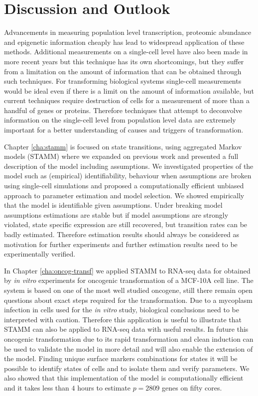 \chapter{Discussion and Outlook}
\label{cha:discussion-outlook}

Advancements in measuring population level transcription, proteomic abundance and epigenetic information cheaply has lead to widespread application of these methods. Additional measurements on a single-cell level have also been made in more recent years \citep{Wheeler:2003ka, Dalerba:2011cc, Wang:2010ew} but this technique has its own shortcomings, but they suffer from a limitation on the amount of information that can be obtained through such techniques. For transforming biological systems single-cell measurements would be ideal even if there is a limit on the amount of information available, but current techniques require destruction of cells for a measurement of more than a handful of genes or proteins. Therefore techniques that attempt to deconvolve information on the single-cell level from population level data are extremely important for a better understanding of causes and triggers of transformation. 

Chapter \ref{cha:stamm} is focused on state transitions, using aggregated Markov models (STAMM) where we expanded on previous work \citep{Armond:2013} and presented a full description of the model including assumptions. We investigated properties of the model such as (empirical) identifiability, behaviour when assumptions are broken using single-cell simulations and proposed a computationally efficient unbiased approach to parameter estimation and model selection. We showed empirically that the model is identifiable given assumptions. Under breaking model assumptions estimations are stable but if model assumptions are strongly violated, state specific expression are still recovered, but transition rates can be badly estimated. Therefore estimation results should always be considered as motivation for further experiments and further estimation results need to be experimentally verified.

In Chapter \ref{cha:oncog-transf} we applied STAMM to RNA-seq data for obtained by {\it in vitro} experiments for oncogenic transformation of a MCF-10A cell line. The system is based on one of the most well studied oncogene, still there remain open questions about exact steps required for the transformation. Due to a mycoplasm infection in  cells used for the {\it in vitro} study, biological conclusions need to be interpreted with caution. Therefore this application is useful to illustrate that STAMM can also be applied to RNA-seq data with useful results. In future this oncogenic transformation due to its rapid transformation and clean induction can be used to validate the model in more detail and will also enable the extension of the model. Finding unique surface markers combinations for states it will be possible to identify states of cells and to isolate them and verify parameters. We also showed that this implementation of the model is computationally efficient and it takes less than $4$ hours to estimate $p=2809$ genes on fifty cores. 

